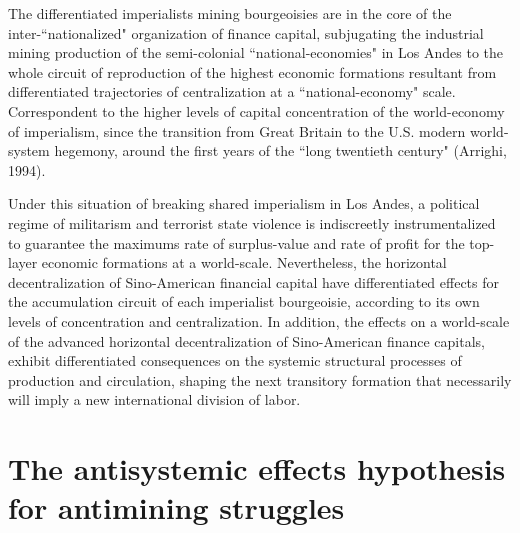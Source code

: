 \documentclass[]{interact}
\theoremstyle{plain}%
\theoremstyle{definition}
\theoremstyle{remark}
\begin{document}
The differentiated imperialists mining bourgeoisies are in the core of the inter-“nationalized" organization of finance capital, subjugating the industrial mining production of the semi-colonial “national-economies" in Los Andes to the whole circuit of reproduction of the highest economic formations resultant from differentiated trajectories of centralization at a “national-economy" scale. Correspondent to the higher levels of capital concentration of the world-economy of imperialism, since the transition from Great Britain to the U.S. modern world-system hegemony, around the first years of the “long twentieth century" (Arrighi, 1994).

Under this situation of breaking shared imperialism in Los Andes, a political regime of militarism and terrorist state violence is indiscreetly instrumentalized to guarantee the maximums rate of surplus-value and rate of profit for the top-layer economic formations at a world-scale. Nevertheless, the horizontal decentralization of Sino-American financial capital have differentiated effects for the accumulation circuit of each imperialist bourgeoisie, according to its own levels of concentration and centralization. In addition, the effects on a world-scale of the advanced horizontal decentralization of Sino-American finance capitals, exhibit differentiated consequences on the systemic structural processes of production and circulation, shaping the next transitory formation that necessarily will imply a new international division of labor.

\section{The antisystemic effects hypothesis for antimining struggles}
\end{document}
